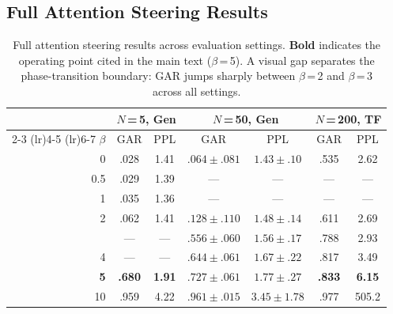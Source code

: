 \subsection{Full Attention Steering Results}\label{sec:appendix-steering}

\begin{table}[t]
\centering\small
\caption{Full attention steering results across evaluation settings.
\textbf{Bold} indicates the operating point cited in the main text ($\beta$\,=\,5).
A visual gap separates the phase-transition boundary: GAR jumps sharply between $\beta$\,=\,2 and $\beta$\,=\,3 across all settings.}
\label{tab:steering-full}
\begin{tabular}{r cc cc cc}
\toprule
 & \multicolumn{2}{c}{\textbf{$N$\,=\,5, Gen}} & \multicolumn{2}{c}{\textbf{$N$\,=\,50, Gen}} & \multicolumn{2}{c}{\textbf{$N$\,=\,200, TF}} \\
\cmidrule(lr){2-3} \cmidrule(lr){4-5} \cmidrule(lr){6-7}
$\beta$ & GAR & PPL & GAR & PPL & GAR & PPL \\
\midrule
0   & .028 & 1.41 & $.064 \pm .081$ & $1.43 \pm .10$ & .535 & 2.62 \\
0.5 & .029 & 1.39 & ---             & ---             & ---  & ---  \\
1   & .035 & 1.36 & ---             & ---             & ---  & ---  \\
2   & .062 & 1.41 & $.128 \pm .110$ & $1.48 \pm .14$ & .611 & 2.69 \\
\addlinespace[3pt]
3   & ---  & ---  & $.556 \pm .060$ & $1.56 \pm .17$ & .788 & 2.93 \\
4   & ---  & ---  & $.644 \pm .061$ & $1.67 \pm .22$ & .817 & 3.49 \\
\textbf{5}  & \textbf{.680} & \textbf{1.91} & $\mathbf{.727 \pm .061}$ & $\mathbf{1.77 \pm .27}$ & \textbf{.833} & \textbf{6.15} \\
10  & .959 & 4.22 & $.961 \pm .015$ & $3.45 \pm 1.78$ & .977 & 505.2 \\
\bottomrule
\end{tabular}
\end{table}
